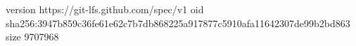 version https://git-lfs.github.com/spec/v1
oid sha256:3947b859c36fe61e62c7b7db868225a917877c5910afa11642307de99b2bd863
size 9707968
